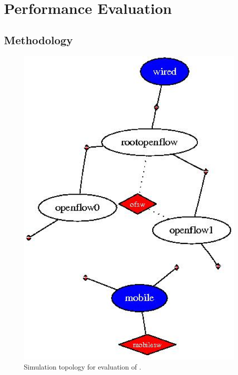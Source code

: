 \section{Performance Evaluation} \label{eval}

\subsection{Methodology}

\begin{figure}[htb!]
\begin{minipage}[t]{0.45\textwidth}
\centerline{\includegraphics[width=\columnwidth]{fig/hoolock_handover}}
\caption{Simulation topology for evaluation of \sys{}.}
\label{fig:hoolock_topo}
\end{minipage}
\hfill
\begin{minipage}[t]{0.45\textwidth}

\end{minipage}
\end{figure}
